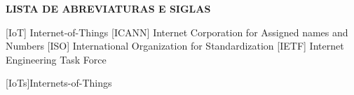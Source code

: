 

\begin{center}
\uppercase{\bfseries lista de abreviaturas e siglas}\\[3em]
\end{center}


\begin{acronym}[xxxxxxxxxxxx] %

       [IoT]   {Internet-of-Things}
     [ICANN] {Internet Corporation for Assigned names and Numbers}
       [ISO]   {International Organization for Standardization}
      [IETF]  {Internet Engineering Task Force}    %

    [IoTs]{Internets-of-Things}

\end{acronym}